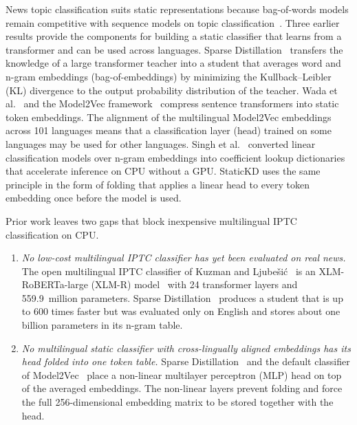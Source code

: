 \documentclass{ieeeaccess}
\begin{document}
News topic classification suits static representations because bag-of-words models remain competitive with sequence models on topic classification~\cite{galke2022bow}. Three earlier results provide the components for building a static classifier that learns from a transformer and can be used across languages. Sparse Distillation~\cite{ye2022sparse} transfers the knowledge of a large transformer teacher into a student that averages word and n-gram embeddings (bag-of-embeddings) by minimizing the Kullback--Leibler (KL) divergence to the output probability distribution of the teacher. Wada et al.~\cite{wada2025static} and the Model2Vec framework~\cite{tulkens2024model2vec} compress sentence transformers into static token embeddings. The alignment of the multilingual Model2Vec embeddings across 101 languages means that a classification layer (head) trained on some languages may be used for other languages. Singh et al.~\cite{singh2023auglinear} converted linear classification models over n-gram embeddings into coefficient lookup dictionaries that accelerate inference on CPU without a GPU. StaticKD uses the same principle in the form of folding that applies a linear head to every token embedding once before the model is used.

Prior work leaves two gaps that block inexpensive multilingual IPTC classification on CPU.
\begin{enumerate}
  \item \emph{No low-cost multilingual IPTC classifier has yet been evaluated on real news.} The open multilingual IPTC classifier of Kuzman and Ljube\v{s}i\'c~\cite{kuzman2025llm} is an XLM-RoBERTa-large (XLM-R) model~\cite{conneau2020xlmr} with 24 transformer layers and 559.9~million parameters. Sparse Distillation~\cite{ye2022sparse} produces a student that is up to 600 times faster but was evaluated only on English and stores about one billion parameters in its n-gram table.
  \item \emph{No multilingual static classifier with cross-lingually aligned embeddings has its head folded into one token table.} Sparse Distillation~\cite{ye2022sparse} and the default classifier of Model2Vec~\cite{tulkens2024model2vec} place a non-linear multilayer perceptron (MLP) head on top of the averaged embeddings. The non-linear layers prevent folding and force the full 256-dimensional embedding matrix to be stored together with the head.
\end{enumerate}
\end{document}
